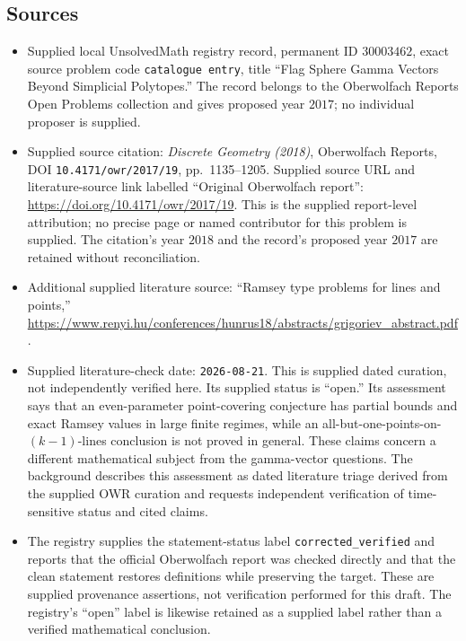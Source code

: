 \documentclass[11pt]{article}
\begin{document}
\subsection{Sources}
\begin{itemize}
\item Supplied local UnsolvedMath registry record, permanent ID \(30003462\), exact source problem code \texttt{catalogue entry}, title ``Flag Sphere Gamma Vectors Beyond Simplicial Polytopes.'' The record belongs to the Oberwolfach Reports Open Problems collection and gives proposed year \(2017\); no individual proposer is supplied.
\item Supplied source citation: \emph{Discrete Geometry (2018)}, Oberwolfach Reports, DOI \texttt{10.4171/owr/2017/19}, pp.\ 1135--1205. Supplied source URL and literature-source link labelled ``Original Oberwolfach report'': \url{https://doi.org/10.4171/owr/2017/19}. This is the supplied report-level attribution; no precise page or named contributor for this problem is supplied. The citation's year \(2018\) and the record's proposed year \(2017\) are retained without reconciliation.
\item Additional supplied literature source: ``Ramsey type problems for lines and points,'' \url{https://www.renyi.hu/conferences/hunrus18/abstracts/grigoriev_abstract.pdf}.
\item Supplied literature-check date: \texttt{2026-08-21}. This is supplied dated curation, not independently verified here. Its supplied status is ``open.'' Its assessment says that an even-parameter point-covering conjecture has partial bounds and exact Ramsey values in large finite regimes, while an all-but-one-points-on-\((k-1)\)-lines conclusion is not proved in general. These claims concern a different mathematical subject from the gamma-vector questions. The background describes this assessment as dated literature triage derived from the supplied OWR curation and requests independent verification of time-sensitive status and cited claims.
\item The registry supplies the statement-status label \texttt{corrected\_verified} and reports that the official Oberwolfach report was checked directly and that the clean statement restores definitions while preserving the target. These are supplied provenance assertions, not verification performed for this draft. The registry's ``open'' label is likewise retained as a supplied label rather than a verified mathematical conclusion.
\end{itemize}
\end{document}
